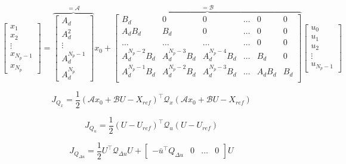 \documentclass[a4paper,12pt,fleqn]{book}
\newcommand{\Np}{{N_p}}
\begin{document}
\begin{equation}
\begin{bmatrix}
x_1\\
x_2\\
\vdots\\
x_{\Np-1}\\
x_{\Np}
\end{bmatrix}=
\overbrace{
\begin{bmatrix}
A_d\\
A_d^2\\
\vdots\\
A_d^{\Np-1}\\
A_d^\Np
\end{bmatrix}
}^{=\mathcal{A}}
x_0 + 
\overbrace{
\begin{bmatrix}
 B_d                &0              &0              &\dots      &0      &0\\
 A_dB_d               &B_d            &0              &\dots      &0      &0\\
 \dots              &\dots          &\dots          &\dots     &0       &0\\
 A_d^{\Np-2}B_d       &A_d^{\Np-3}B_d   &A_d^{\Np-4}B_d   &\dots     &B_d       &0\\
 A_d^{\Np-1}B_d       &A_d^{\Np-2}B_d   &A_d^{\Np-3}B_d   &\dots     &A_dB_d      &B_d \\
\end{bmatrix}
}^{=\mathcal B}
\begin{bmatrix}
u_0\\
u_1\\
u_2\\
\vdots\\
u_{\Np-1}
\end{bmatrix}
\end{equation}

\begin{equation}
 J_{Q_x} = \frac{1}{2} \left(\mathcal{A} x_0 + \mathcal{B} U - X_{ref}\right)^\top \mathcal{Q}_x \left(\mathcal{A} x_0 + \mathcal{B} U - X_{ref}\right)
\end{equation}

\begin{equation}
 J_{Q_u} =  \frac{1}{2} (U - U_{ref})^\top \mathcal{Q}_u (U-U_{ref})
\end{equation}

\begin{equation}
 J_{Q_{\Delta u}} =  \frac{1}{2} U^\top \mathcal{Q}_{\Delta u} U +   
 \begin{bmatrix}
  -{\bar u}^\top Q_{\Delta u} & 0 & \dots  & 0
 \end{bmatrix} U
\end{equation}
\end{document}
